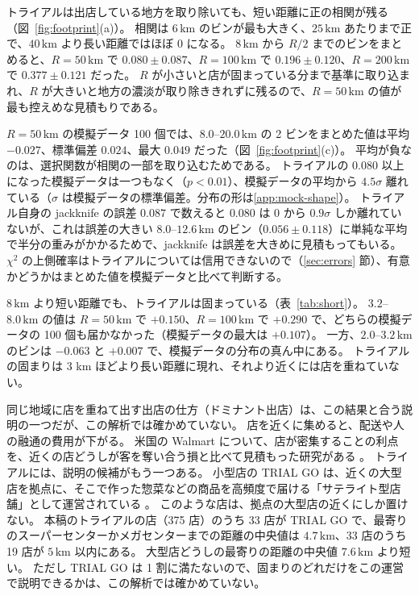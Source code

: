 \documentclass[a4paper,11pt]{ltjsarticle}
\begin{document}
トライアルは出店している地方を取り除いても、短い距離に正の相関が残る（図~\ref{fig:footprint}(a)）。
相関は $6\,\mathrm{km}$ のビンが最も大きく、$25\,\mathrm{km}$ あたりまで正で、$40\,\mathrm{km}$ より長い距離ではほぼ $0$ になる。
$8\,\mathrm{km}$ から $R/2$ までのビンをまとめると、$R = 50\,\mathrm{km}$ で $0.080 \pm 0.087$、$R = 100\,\mathrm{km}$ で $0.196 \pm 0.120$、$R = 200\,\mathrm{km}$ で $0.377 \pm 0.121$ だった。
$R$ が小さいと店が固まっている分まで基準に取り込まれ、$R$ が大きいと地方の濃淡が取り除ききれずに残るので、$R = 50\,\mathrm{km}$ の値が最も控えめな見積もりである。

$R = 50\,\mathrm{km}$ の模擬データ 100 個では、$8.0$--$20.0\,\mathrm{km}$ の 2 ビンをまとめた値は平均 $-0.027$、標準偏差 $0.024$、最大 $0.049$ だった（図~\ref{fig:footprint}(c)）。
平均が負なのは、選択関数が相関の一部を取り込むためである。
トライアルの $0.080$ 以上になった模擬データは一つもなく（$p < 0.01$）、模擬データの平均から $4.5\sigma$ 離れている（$\sigma$ は模擬データの標準偏差。分布の形は\ref{app:mock-shape}）。
トライアル自身の jackknife の誤差 $0.087$ で数えると $0.080$ は $0$ から $0.9\sigma$ しか離れていないが、これは誤差の大きい $8.0$--$12.6\,\mathrm{km}$ のビン（$0.056 \pm 0.118$）に単純な平均で半分の重みがかかるためで、jackknife は誤差を大きめに見積もってもいる。
$\chi^2$ の上側確率はトライアルについては信用できないので（\ref{sec:errors} 節）、有意かどうかはまとめた値を模擬データと比べて判断する。

$8\,\mathrm{km}$ より短い距離でも、トライアルは固まっている（表~\ref{tab:short}）。
$3.2$--$8.0\,\mathrm{km}$ の値は $R = 50\,\mathrm{km}$ で $+0.150$、$R = 100\,\mathrm{km}$ で $+0.290$ で、どちらの模擬データの 100 個も届かなかった（模擬データの最大は $+0.107$）。
一方、$2.0$--$3.2\,\mathrm{km}$ のビンは $-0.063$ と $+0.007$ で、模擬データの分布の真ん中にある。
トライアルの固まりは $3$ km ほどより長い距離に現れ、それより近くには店を重ねていない。

同じ地域に店を重ねて出す出店の仕方（ドミナント出店）は、この結果と合う説明の一つだが、この解析では確かめていない。
店を近くに集めると、配送や人の融通の費用が下がる。
米国の Walmart について、店が密集することの利点を、近くの店どうしが客を奪い合う損と比べて見積もった研究がある \cite{Holmes2011}。
トライアルには、説明の候補がもう一つある。
小型店の TRIAL GO は、近くの大型店を拠点に、そこで作った惣菜などの商品を高頻度で届ける「サテライト型店舗」として運営されている \cite{TrialGO2025,ImpressTrialGO2025}。
このような店は、拠点の大型店の近くにしか置けない。
本稿のトライアルの店（375 店）のうち 33 店が TRIAL GO で、最寄りのスーパーセンターかメガセンターまでの距離の中央値は $4.7\,\mathrm{km}$、33 店のうち 19 店が $5\,\mathrm{km}$ 以内にある。
大型店どうしの最寄りの距離の中央値 $7.6\,\mathrm{km}$ より短い。
ただし TRIAL GO は 1 割に満たないので、固まりのどれだけをこの運営で説明できるかは、この解析では確かめていない。
\end{document}
